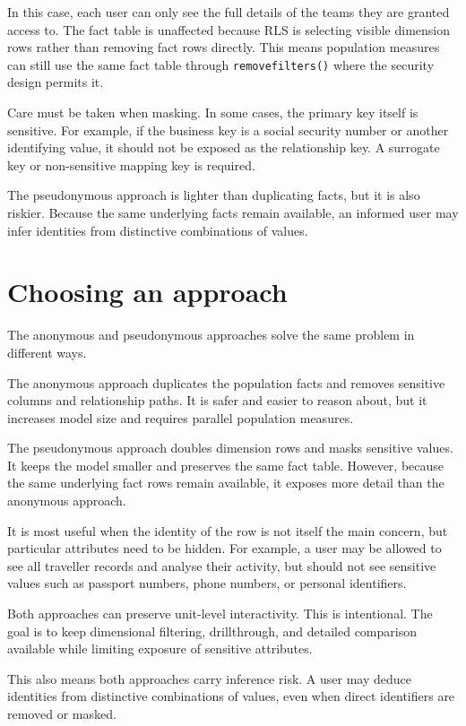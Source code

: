 \documentclass[10pt,openany,10pt]{book}
\begin{document}
In this case, each user can only see the full details of the teams they
are granted access to. The fact table is unaffected because RLS is
selecting visible dimension rows rather than removing fact rows
directly. This means population measures can still use the same fact
table through \texttt{removefilters()} where the security design permits
it.

Care must be taken when masking. In some cases, the primary key itself
is sensitive. For example, if the business key is a social security
number or another identifying value, it should not be exposed as the
relationship key. A surrogate key or non-sensitive mapping key is
required.

The pseudonymous approach is lighter than duplicating facts, but it is
also riskier. Because the same underlying facts remain available, an
informed user may infer identities from distinctive combinations of
values.

\section{Choosing an approach}\label{choosing-an-approach}

The anonymous and pseudonymous approaches solve the same problem in
different ways.

The anonymous approach duplicates the population facts and removes
sensitive columns and relationship paths. It is safer and easier to
reason about, but it increases model size and requires parallel
population measures.

The pseudonymous approach doubles dimension rows and masks sensitive
values. It keeps the model smaller and preserves the same fact table.
However, because the same underlying fact rows remain available, it
exposes more detail than the anonymous approach.

It is most useful when the identity of the row is not itself the main
concern, but particular attributes need to be hidden. For example, a
user may be allowed to see all traveller records and analyse their
activity, but should not see sensitive values such as passport numbers,
phone numbers, or personal identifiers.

Both approaches can preserve unit-level interactivity. This is
intentional. The goal is to keep dimensional filtering, drillthrough,
and detailed comparison available while limiting exposure of sensitive
attributes.

This also means both approaches carry inference risk. A user may deduce
identities from distinctive combinations of values, even when direct
identifiers are removed or masked.
\end{document}
